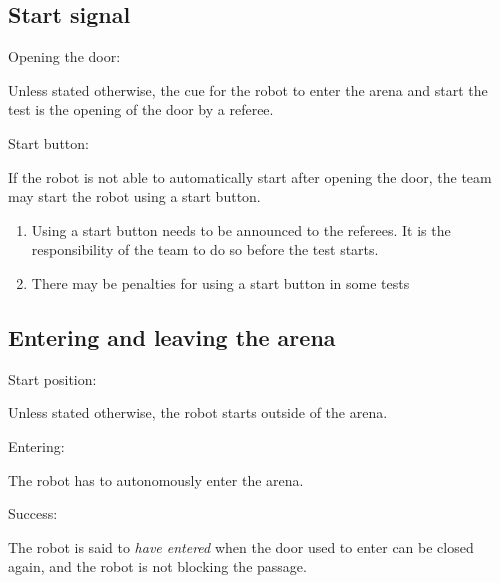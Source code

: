 \subsection{Start signal}\label{rule:start_signal}

\begin{enumerate}
  {\bf\item Opening the door:} Unless stated otherwise, the cue for the robot to enter the arena and start the test is the opening of the door by a referee.
  {\bf\item Start button:} If the robot is not able to automatically start after opening the door, the team may start the robot using a start button. 
  \begin{enumerate}
    \item Using a start button needs to be announced to the referees. It is the responsibility of the team to do so before the test starts.
    \item There may be penalties for using a start button in some tests
  \end{enumerate}
\end{enumerate}


\subsection{Entering and leaving the arena}\label{rule:start_position}
\begin{enumerate}
  {\bf\item Start position:} Unless stated otherwise, the robot starts outside of the arena.
  {\bf\item Entering:} The robot has to autonomously enter the arena.
  {\bf\item Success:} The robot is said to \emph{have entered} when the door used to enter can be closed again, and the robot is not blocking the passage.
\end{enumerate}



